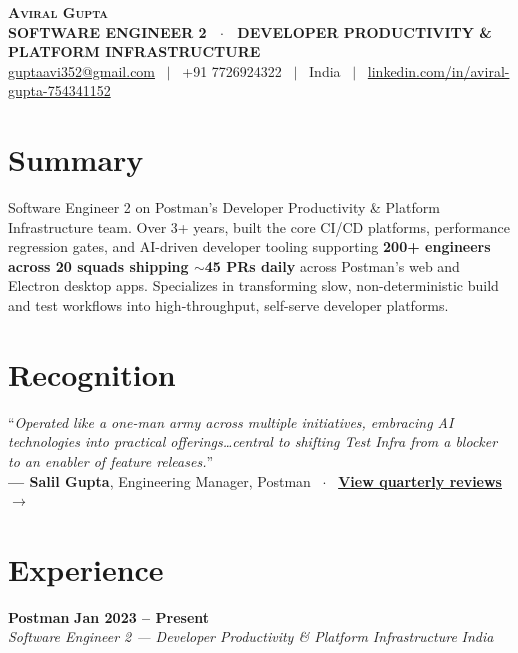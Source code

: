 \documentclass[9.5pt,a4paper]{article}
\begin{document}
\begin{center}
    {\fontsize{18}{20}\selectfont \textbf{\scshape Aviral Gupta}} \\[1.5pt]
    {\footnotesize \textbf{\color{accent} SOFTWARE ENGINEER 2 \ $\cdot$ \ DEVELOPER PRODUCTIVITY \& PLATFORM INFRASTRUCTURE}} \\[2.5pt]
    \footnotesize \href{mailto:guptaavi352@gmail.com}{guptaavi352@gmail.com} \ $|$ \ 
    +91 7726924322 \ $|$ \ 
    India \ $|$ \ 
    \href{https://www.linkedin.com/in/aviral-gupta-754341152/}{linkedin.com/in/aviral-gupta-754341152}
\end{center}
\vspace{-8pt}

\section{Summary}
\vspace{1pt}
{\small
Software Engineer 2 on Postman's Developer Productivity \& Platform Infrastructure team. Over 3+ years, built the core CI/CD platforms, performance regression gates, and AI-driven developer tooling supporting \textbf{200+ engineers across 20 squads shipping $\sim$45 PRs daily} across Postman's web and Electron desktop apps. Specializes in transforming slow, non-deterministic build and test workflows into high-throughput, self-serve developer platforms.
}
\vspace{-3pt}

\section{Recognition}
\vspace{1pt}
{\small
``\textit{Operated like a one-man army across multiple initiatives, embracing AI technologies into practical offerings\dots central to shifting Test Infra from a blocker to an enabler of feature releases.}'' \\
\vspace{0.5pt}
\hspace*{8pt}\textbf{--- Salil Gupta}, Engineering Manager, Postman \ $\cdot$ \ \href{https://aviralgupta752.github.io/Aviral-Resume/}{\textbf{View quarterly reviews $\rightarrow$}}
}
\vspace{-3pt}

\section{Experience}
  \vspace{-1pt}
  \noindent\textbf{Postman} \hfill \textbf{\small Jan 2023 -- Present} \\
  \textit{\small Software Engineer 2 --- Developer Productivity \& Platform Infrastructure} \hfill \textit{\small India} \\
  \vspace{-2pt}
\end{document}
